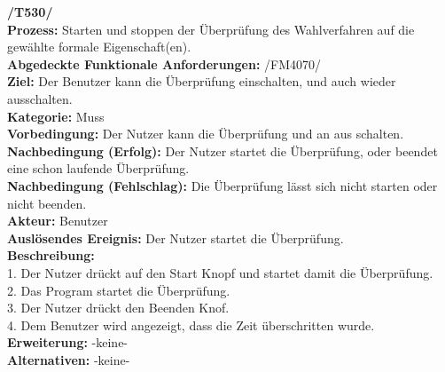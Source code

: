 \documentclass[a4paper]{scrreprt}
\begin{document}
\textbf{/T530/}\\
\textbf{Prozess:} Starten und stoppen der Überprüfung des Wahlverfahren auf die gewählte formale Eigenschaft(en).\\
\textbf{Abgedeckte Funktionale Anforderungen:} /FM4070/ \\
\textbf{Ziel:} Der Benutzer kann die Überprüfung einschalten, und auch wieder
ausschalten.\\
\textbf{Kategorie:} Muss\\
\textbf{Vorbedingung:} Der Nutzer kann die Überprüfung und an aus schalten.\\
\textbf{Nachbedingung (Erfolg):} Der Nutzer startet die Überprüfung, oder
beendet eine schon laufende Überprüfung.\\
\textbf{Nachbedingung (Fehlschlag):} Die Überprüfung lässt sich nicht
starten oder nicht beenden.\\
\textbf{Akteur:} Benutzer\\
\textbf{Auslösendes Ereignis:} Der Nutzer startet die Überprüfung.\\
\textbf{Beschreibung:} \\
1. Der Nutzer drückt auf den Start Knopf und startet damit die Überprüfung.\\
2. Das Program startet die Überprüfung.\\
3. Der Nutzer drückt den Beenden Knof.\\
4. Dem Benutzer wird angezeigt, dass die Zeit überschritten wurde.\\
\textbf {Erweiterung:}  -keine- \\
\textbf {Alternativen:} -keine- \\ \\
\end{document}
